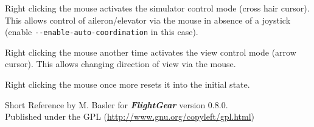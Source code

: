 \documentclass[10pt]{article}
\newcommand{\FlightGear}{{\itshape\bfseries FlightGear}}
\newcommand{\web}[1]{\href{#1}{#1}}
\begin{document}
 \noindent
 Right clicking the mouse activates the simulator control mode (cross hair cursor). This allows
 control of aileron/elevator via the mouse in absence of a joystick
 (enable \texttt{-$ $-enable-auto-coordination} in this case).

 \noindent
 Right clicking the mouse another time activates the view control mode (arrow cursor).
 This allows changing direction of view via the mouse.

 \noindent
 Right clicking the mouse once more resets it into the initial state.
 \medskip

 \noindent
 Short Reference by M. Basler for \FlightGear{} version 0.8.0.\\
 Published under the GPL (\web{http://www.gnu.org/copyleft/gpl.html})
\end{document}
